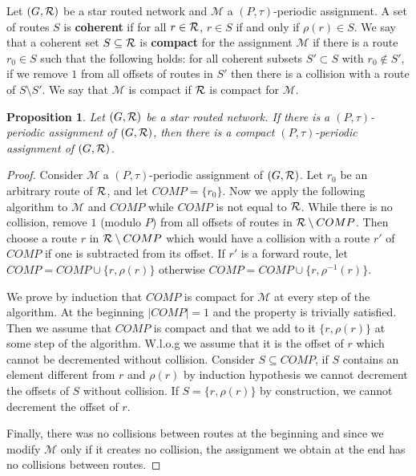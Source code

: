\documentclass[10pt, conference, letterpaper]{IEEEtran}
\newtheorem{proposition}{Proposition}
\begin{document}
Let $(G, {\cal R})$ be a star routed network and $\mathcal{M}$ a $(P,\tau)$-periodic assignment.
A set of routes $S$ is \textbf{coherent} if for all $r \in {\cal R}$, $r \in S$ if and only if $\rho(r) \in S$. We say that a coherent set $S \subseteq {\cal R}$ is \textbf{compact} for the assignment $\mathcal{M}$ if there is a route $r_0 \in S$ such that the following holds:  
for all coherent subsets $S'\subset S$ with $r_0 \notin S'$, if we remove $1$ from all offsets of routes in $S'$ then there is a collision with a route of $S \setminus S'$. We say that $\mathcal{M}$ is compact if ${\cal R}$ is compact for $\mathcal{M}$. 
% 
% 

\begin{proposition}
Let $(G, {\cal R})$ be a star routed network. If there is a $(P,\tau)$-periodic assignment of $(G, {\cal R})$, then there is a compact $(P,\tau)$-periodic assignment of $(G, {\cal R})$.
\end{proposition}
\begin{proof}
Consider $\mathcal{M}$ a $(P,\tau)$-periodic assignment of $(G, {\cal R})$.
Let $r_0$ be an arbitrary route of ${\cal R}$,  and let $COMP = \{r_0\}$. Now we apply the following algorithm to $\mathcal{M}$ and $COMP$ while $COMP$ is not equal to ${\cal R}$.
While there is no collision, remove $1$ (modulo $P$) from all offsets of routes in ${\cal R} \setminus COMP$. Then choose a route $r$ in ${\cal R} \setminus COMP$ which would have a collision with a route $r'$ of $COMP$ if one is subtracted from its offset. If $r'$ is a forward route, let $COMP = COMP \cup \{r, \rho(r)\}$ otherwise  $COMP = COMP \cup \{r, \rho^{-1}(r)\}$. 

We prove by induction that $COMP$ is compact for $\mathcal{M}$ at every step of the algorithm.
At the beginning $|COMP| = 1$ and the property is trivially satisfied. Then we assume that 
$COMP$ is compact and that we add to it $\{r, \rho(r)\}$ at some step of the algorithm. W.l.o.g we assume that it is the offset of $r$ which cannot be decremented without collision. Consider $S \subseteq   COMP$, if $S$ contains an element different from $r$ and $\rho(r)$ by induction hypothesis we cannot decrement the offsets of $S$ without collision. If $S =\{r, \rho(r)\}$
by construction, we cannot decrement the offset of $r$. 

Finally, there was no collisions between routes at the beginning and since we modify $\mathcal{M}$ only if it creates no collision, the assignment we obtain at the end has no collisions between routes.
\end{proof}
\end{document}
